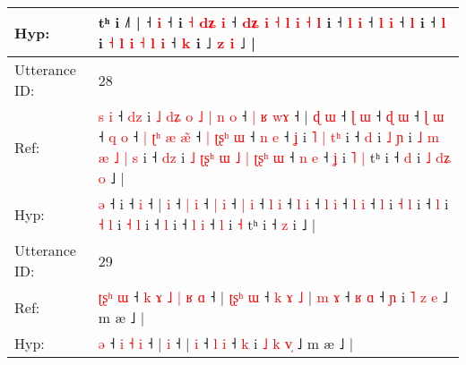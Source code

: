 \documentclass[10pt]{article}
\DeclareRobustCommand{\hl}[1]{{\textcolor{red}{#1}}}
\begin{document}
\begin{longtable}{ll}
 \\
Hyp: & tʰ i ˩˥ |\hl{}\hl{}\hl{}\hl{}\hl{}\hl{} ˧\hl{}\hl{} \hl{i} ˧\hl{}\hl{} i\hl{}\hl{}\hl{}\hl{}\hl{}\hl{} \hl{˧} \hl{}\hl{d}\hl{ʑ} \hl{i} ˧ \hl{}\hl{d}\hl{ʑ} \hl{i} \hl{˧} \hl{l} \hl{i} \hl{˧} \hl{l} i ˧ \hl{l} \hl{i} ˧ \hl{l} \hl{}\hl{i} ˧\hl{}\hl{}\hl{} \hl{l} i ˧ \hl{}\hl{l} i\hl{}\hl{} \hl{}\hl{˧} \hl{l} \hl{i} \hl{˧} \hl{l} \hl{}\hl{i} ˧\hl{}\hl{}\hl{} \hl{k} i ˩ \hl{z} \hl{}\hl{i} ˩ |
 \\
\midrule
Utterance ID: & 28 \\
Ref: & \hl{s}\hl{ }\hl{i} ˧\hl{ }\hl{d}\hl{z} i\hl{ }\hl{˩}\hl{ }\hl{d}\hl{ʑ}\hl{ }\hl{o}\hl{ }\hl{˩}\hl{ }\hl{|}\hl{ }\hl{n}\hl{ }\hl{o} ˧\hl{ }\hl{|}\hl{ }\hl{ʁ} \hl{w}\hl{ɤ} ˧ |\hl{ }\hl{ɖ} \hl{ɯ} ˧ \hl{ɭ} \hl{ɯ} ˧ \hl{ɖ} \hl{ɯ} ˧ \hl{ɭ} \hl{ɯ} ˧ \hl{q} \hl{o} ˧\hl{ }\hl{|}\hl{ }\hl{ʈ}\hl{ʰ} \hl{æ} \hl{æ}\hl{̃} ˧\hl{ }\hl{|} \hl{ʈ}\hl{ʂ}\hl{ʰ} \hl{ɯ} ˧ \hl{n} \hl{e} ˧ \hl{ʝ} i\hl{ }\hl{˥} \hl{|} \hl{t}\hl{ʰ} i ˧ \hl{d} i \hl{˩} \hl{ɲ} i\hl{ }\hl{˩}\hl{ }\hl{m}\hl{ }\hl{æ}\hl{ }\hl{˩} \hl{|} \hl{s} i ˧ \hl{d}\hl{z} i\hl{ }\hl{˩}\hl{ }\hl{ʈ}\hl{ʂ}\hl{ʰ}\hl{ }\hl{ɯ}\hl{ }\hl{˩}\hl{ }\hl{|}\hl{ }\hl{ʈ}\hl{ʂ}\hl{ʰ}\hl{ }\hl{ɯ} ˧ \hl{n} \hl{e} ˧ \hl{ʝ} i\hl{ }\hl{˥} \hl{|} tʰ i ˧ \hl{d} i\hl{ }\hl{˩}\hl{ }\hl{d}\hl{ʑ}\hl{ }\hl{o} ˩ |
 \\
Hyp: & \hl{}\hl{}\hl{ə} ˧\hl{}\hl{}\hl{} i\hl{}\hl{}\hl{}\hl{}\hl{}\hl{}\hl{}\hl{}\hl{}\hl{}\hl{}\hl{}\hl{}\hl{}\hl{} ˧\hl{}\hl{}\hl{}\hl{} \hl{}\hl{i} ˧ |\hl{}\hl{} \hl{i} ˧ \hl{|} \hl{i} ˧ \hl{|} \hl{i} ˧ \hl{|} \hl{i} ˧ \hl{l} \hl{i} ˧\hl{}\hl{}\hl{}\hl{}\hl{} \hl{l} \hl{}\hl{i} ˧\hl{}\hl{} \hl{}\hl{}\hl{l} \hl{i} ˧ \hl{l} \hl{i} ˧ \hl{l} i\hl{}\hl{} \hl{˧} \hl{}\hl{l} i ˧ \hl{l} i \hl{˧} \hl{l} i\hl{}\hl{}\hl{}\hl{}\hl{}\hl{}\hl{}\hl{} \hl{˧} \hl{l} i ˧ \hl{}\hl{l} i\hl{}\hl{}\hl{}\hl{}\hl{}\hl{}\hl{}\hl{}\hl{}\hl{}\hl{}\hl{}\hl{}\hl{}\hl{}\hl{}\hl{}\hl{} ˧ \hl{l} \hl{i} ˧ \hl{l} i\hl{}\hl{} \hl{˧} tʰ i ˧ \hl{z} i\hl{}\hl{}\hl{}\hl{}\hl{}\hl{}\hl{} ˩ |
 \\
\midrule
Utterance ID: & 29 \\
Ref: & \hl{ʈ}\hl{ʂ}\hl{ʰ}\hl{ }\hl{ɯ} ˧\hl{ }\hl{k}\hl{ }\hl{ɤ}\hl{ }\hl{˩} \hl{|} \hl{ʁ} \hl{ɑ} ˧ |\hl{ }\hl{ʈ}\hl{ʂ}\hl{ʰ} \hl{ɯ} ˧\hl{ }\hl{k}\hl{ }\hl{ɤ}\hl{ }\hl{˩} |\hl{ }\hl{m} \hl{ɤ} ˧ \hl{ʁ} \hl{ɑ} ˧ \hl{ɲ} i \hl{˥} \hl{z} \hl{}\hl{e} ˩ m æ ˩ |
 \\
Hyp: & \hl{}\hl{}\hl{}\hl{}\hl{ə} ˧\hl{}\hl{}\hl{}\hl{}\hl{}\hl{} \hl{i} \hl{˧} \hl{i} ˧ |\hl{}\hl{}\hl{}\hl{} \hl{i} ˧\hl{}\hl{}\hl{}\hl{}\hl{}\hl{} |\hl{}\hl{} \hl{i} ˧ \hl{l} \hl{i} ˧ \hl{k} i \hl{˩} \hl{k} \hl{v}\hl{̩} ˩ m æ ˩ |

\end{longtable}
\end{document}

